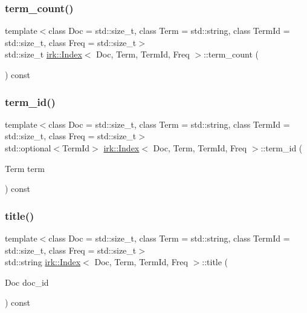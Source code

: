 \mbox{\label{classirk_1_1Index_af44451a0920202002c716e64a5f2fe03}} 
\subsubsection{\texorpdfstring{term\+\_\+count()}{term\_count()}}
{\footnotesize\ttfamily template$<$class Doc  = std\+::size\+\_\+t, class Term  = std\+::string, class Term\+Id  = std\+::size\+\_\+t, class Freq  = std\+::size\+\_\+t$>$ \\
std\+::size\+\_\+t \mbox{\hyperlink{classirk_1_1Index}{irk\+::\+Index}}$<$ Doc, Term, Term\+Id, Freq $>$\+::term\+\_\+count (\begin{DoxyParamCaption}{ }\end{DoxyParamCaption}) const\hspace{0.3cm}{\ttfamily [inline]}}

\mbox{\label{classirk_1_1Index_adf03f14a502c40a0428ec9cc9f638a68}} 
\subsubsection{\texorpdfstring{term\+\_\+id()}{term\_id()}}
{\footnotesize\ttfamily template$<$class Doc  = std\+::size\+\_\+t, class Term  = std\+::string, class Term\+Id  = std\+::size\+\_\+t, class Freq  = std\+::size\+\_\+t$>$ \\
std\+::optional$<$Term\+Id$>$ \mbox{\hyperlink{classirk_1_1Index}{irk\+::\+Index}}$<$ Doc, Term, Term\+Id, Freq $>$\+::term\+\_\+id (\begin{DoxyParamCaption}\item[{Term}]{term }\end{DoxyParamCaption}) const\hspace{0.3cm}{\ttfamily [inline]}}

\mbox{\label{classirk_1_1Index_a9cab8400d1213a23ac1d846cd8f3b1ac}} 
\subsubsection{\texorpdfstring{title()}{title()}}
{\footnotesize\ttfamily template$<$class Doc  = std\+::size\+\_\+t, class Term  = std\+::string, class Term\+Id  = std\+::size\+\_\+t, class Freq  = std\+::size\+\_\+t$>$ \\
std\+::string \mbox{\hyperlink{classirk_1_1Index}{irk\+::\+Index}}$<$ Doc, Term, Term\+Id, Freq $>$\+::title (\begin{DoxyParamCaption}\item[{Doc}]{doc\+\_\+id }\end{DoxyParamCaption}) const\hspace{0.3cm}{\ttfamily [inline]}}

